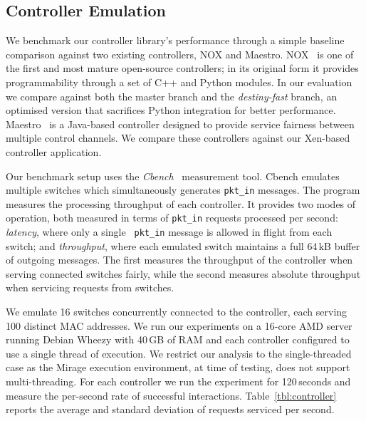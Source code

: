 \subsection{\mirage Controller Emulation} \label{sec:of-controller-perf}

We benchmark our controller library's performance through a simple baseline
comparison against two existing \of controllers, NOX and Maestro.
NOX~ is one of the first and most mature open-source \of controllers;
in its original form it provides programmability through a set of C++ and Python
modules.  In our evaluation we compare against both the master branch and the
{\it destiny-fast} \/branch, an optimised version that sacrifices Python
integration for better performance.  Maestro~ is a Java-based
controller designed to provide service fairness between multiple \of control
channels.  We compare these controllers against our Xen-based \mirage \of
controller application.

Our benchmark setup uses the {\it Cbench}~ measurement tool. Cbench
emulates multiple switches which simultaneously generates {\tt pkt\_in}
messages.  The program measures the processing throughput of each controller.
It provides two modes of operation, both measured in terms of {\tt pkt\_in}
requests processed per second: {\it latency}, where only a single {\tt
  pkt\_in} message is allowed in flight from each switch; and {\it
  throughput}, where each emulated switch maintains a full 64\,kB buffer of
outgoing messages. The first measures the throughput of the controller when
serving connected switches fairly, while the second measures absolute throughput
when servicing requests from switches.
                                                                       
We emulate 16 switches concurrently connected to the controller, each serving
100 distinct MAC addresses. We run our experiments on a 16-core AMD server
running Debian Wheezy with 40\,GB of RAM and each controller configured to use a
single thread of execution. We restrict our analysis to the single-threaded case
as the Mirage execution environment, at time of testing, does not support
multi-threading. For each controller we run the experiment for 120\,seconds and
measure the per-second rate of successful interactions.
Table~\ref{tbl:controller} reports the average and standard deviation of
requests serviced per second.

